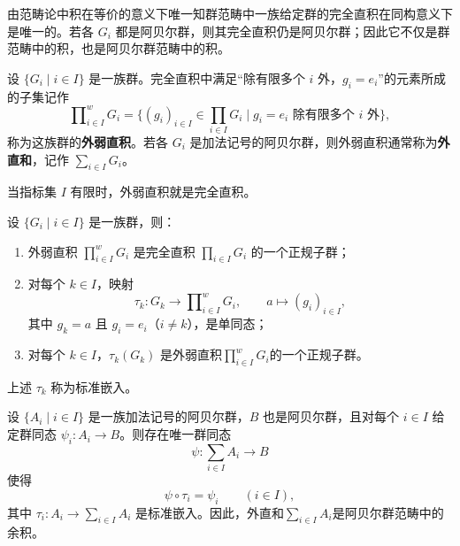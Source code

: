 \begin{purplenote}
由范畴论中积在等价的意义下唯一知群范畴中一族给定群的完全直积在同构意义下是唯一的。若各 $G_i$ 都是阿贝尔群，则其完全直积仍是阿贝尔群；因此它不仅是群范畴中的积，也是阿贝尔群范畴中的积。
\end{purplenote}

\begin{definition}[外弱直积与外直和]\label{def:external-weak-direct-product}
设 $\{G_i\mid i\in I\}$ 是一族群。完全直积中满足“除有限多个 $i$ 外，$g_i=e_i$”的元素所成的子集记作
\[
  \prod\nolimits_{i\in I}^{w}G_i
  =\{(g_i)_{i\in I}\in\prod_{i\in I}G_i
      \mid g_i=e_i\text{ 除有限多个 }i\text{ 外}
    \},
\]
称为这族群的\textbf{外弱直积}。若各 $G_i$ 是加法记号的阿贝尔群，则外弱直积通常称为\textbf{外直和}，记作 $\sum_{i\in I}G_i$。
\end{definition}

\begin{purplenote}
当指标集 $I$ 有限时，外弱直积就是完全直积。
\end{purplenote}

\begin{theorem}\label{thm:weak-product-embeddings}
设 $\{G_i\mid i\in I\}$ 是一族群，则：
\begin{enumerate}[label=(\arabic*)]
  \item 外弱直积 $\prod\nolimits_{i\in I}^{w}G_i$ 是完全直积 $\prod_{i\in I}G_i$ 的一个正规子群；
  \item 对每个 $k\in I$，映射
  \[
    \tau_k:G_k\longrightarrow\prod\nolimits_{i\in I}^{w}G_i,
    \qquad a\longmapsto(g_i)_{i\in I},
  \]
  其中 $g_k=a$ 且 $g_i=e_i$（$i\neq k$），是单同态；
  \item 对每个 $k\in I$，$\tau_k(G_k)$ 是外弱直积$\prod\nolimits_{i\in I}^{w}G_i$的一个正规子群。
\end{enumerate}
\end{theorem}

\begin{purplenote}
上述 $\tau_k$ 称为标准嵌入。
\end{purplenote}

\begin{theorem}\label{thm:weak-direct-sum-universal-property}
设 $\{A_i\mid i\in I\}$ 是一族加法记号的阿贝尔群，$B$ 也是阿贝尔群，且对每个 $i\in I$ 给定群同态 $\psi_i:A_i\to B$。则存在唯一群同态
\[
  \psi:\sum_{i\in I}A_i\longrightarrow B
\]
使得
\[
  \psi\circ\tau_i=\psi_i\qquad(i\in I),
\]
其中 $\tau_i:A_i\to\sum_{i\in I}A_i$ 是标准嵌入。因此，外直和$\sum_{i\in I}A_i$是阿贝尔群范畴中的余积。
\end{theorem}

